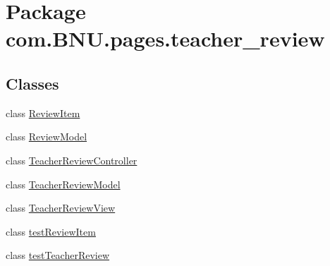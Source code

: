\hypertarget{namespacecom_1_1_b_n_u_1_1pages_1_1teacher__review}{}\section{Package com.\+B\+N\+U.\+pages.\+teacher\+\_\+review}
\label{namespacecom_1_1_b_n_u_1_1pages_1_1teacher__review}
\subsection*{Classes}
\begin{DoxyCompactItemize}
\item 
class \mbox{\hyperlink{classcom_1_1_b_n_u_1_1pages_1_1teacher__review_1_1_review_item}{Review\+Item}}
\item 
class \mbox{\hyperlink{classcom_1_1_b_n_u_1_1pages_1_1teacher__review_1_1_review_model}{Review\+Model}}
\item 
class \mbox{\hyperlink{classcom_1_1_b_n_u_1_1pages_1_1teacher__review_1_1_teacher_review_controller}{Teacher\+Review\+Controller}}
\item 
class \mbox{\hyperlink{classcom_1_1_b_n_u_1_1pages_1_1teacher__review_1_1_teacher_review_model}{Teacher\+Review\+Model}}
\item 
class \mbox{\hyperlink{classcom_1_1_b_n_u_1_1pages_1_1teacher__review_1_1_teacher_review_view}{Teacher\+Review\+View}}
\item 
class \mbox{\hyperlink{classcom_1_1_b_n_u_1_1pages_1_1teacher__review_1_1test_review_item}{test\+Review\+Item}}
\item 
class \mbox{\hyperlink{classcom_1_1_b_n_u_1_1pages_1_1teacher__review_1_1test_teacher_review}{test\+Teacher\+Review}}
\end{DoxyCompactItemize}

